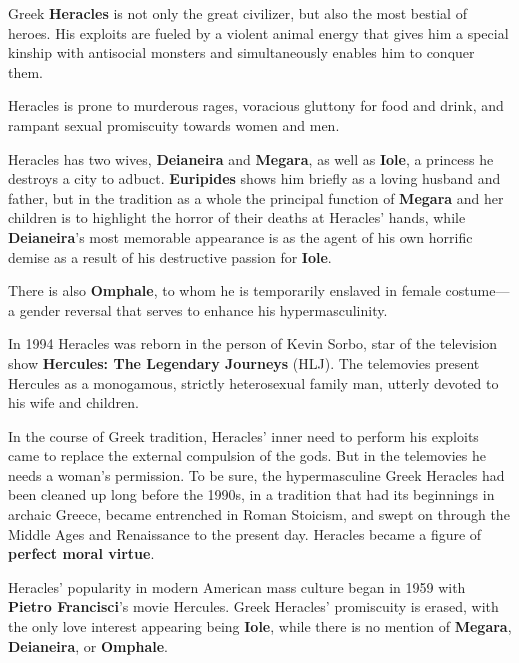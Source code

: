 Greek \textbf{Heracles} is not only the great civilizer, but also the most bestial of heroes. His exploits are fueled by a violent animal energy that gives him a special kinship with antisocial monsters and simultaneously enables him to conquer them.

\begin{nte}
    Heracles is prone to murderous rages, voracious gluttony for food and drink, and rampant sexual promiscuity towards women and men.
\end{nte}

\begin{nte}
    Heracles has two wives, \textbf{Deianeira} and \textbf{Megara}, as well as \textbf{Iole}, a princess he destroys a city to adbuct. \textbf{Euripides} shows him briefly as a loving husband and father, but in the tradition as a whole the principal function of \textbf{Megara} and her children is to highlight the horror of their deaths at Heracles' hands, while \textbf{Deianeira}'s most memorable appearance is as the agent of his own horrific demise as a result of his destructive passion for \textbf{Iole}.
\end{nte}

There is also \textbf{Omphale}, to whom he is temporarily enslaved in female costume---a gender reversal that serves to enhance his hypermasculinity.

\begin{rmk}
    In 1994 Heracles was reborn in the person of Kevin Sorbo, star of the television show \textbf{Hercules: The Legendary Journeys} (HLJ). The telemovies present Hercules as a monogamous, strictly heterosexual family man, utterly devoted to his wife and children.
\end{rmk}

In the course of Greek tradition, Heracles' inner need to perform his exploits came to replace the external compulsion of the gods. But in the telemovies he needs a woman's permission. To be sure, the hypermasculine Greek Heracles had been cleaned up long before the 1990s, in a tradition that had its beginnings in archaic Greece, became entrenched in Roman Stoicism, and swept on through the Middle Ages and Renaissance to the present day. Heracles became a figure of \textbf{perfect moral virtue}.

Heracles' popularity in modern American mass culture began in 1959 with \textbf{Pietro Francisci}'s movie Hercules. Greek Heracles' promiscuity is erased, with the only love interest appearing being \textbf{Iole}, while there is no mention of \textbf{Megara}, \textbf{Deianeira}, or \textbf{Omphale}.


